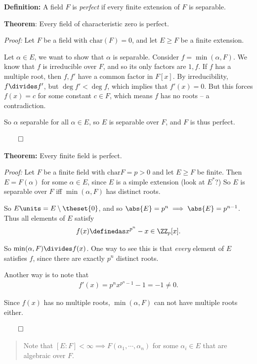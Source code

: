 \textbf{Definition:} A field \(F\) is \emph{perfect} if every finite
extension of \(F\) is separable.

\textbf{Theorem}: Every field of characteristic zero is perfect.

\emph{Proof:} Let \(F\) be a field with \(\mathrm{char}(F) = 0\), and
let \(E \geq F\) be a finite extension.

Let \(\alpha \in E\), we want to show that \(\alpha\) is separable.
Consider \(f = \min(\alpha, F)\). We know that \(f\) is irreducible over
\(F\), and so its only factors are \(1, f\). If \(f\) has a multiple
root, then \(f, f'\) have a common factor in \(F[x]\). By
irreducibility, \(f \divides f'\), but \(\deg f' < \deg f\), which
implies that \(f'(x) = 0\). But this forces \(f(x) = c\) for some
constant \(c\in F\), which means \(f\) has no roots -- a contradiction.

So \(\alpha\) separable for all \(\alpha \in E\), so \(E\) is separable
over \(F\), and \(F\) is thus perfect.

\(\qed\)

\textbf{Theorem:} Every finite field is perfect.

\emph{Proof:} Let \(F\) be a finite field with
\(\mathrm{char} F = p > 0\) and let \(E \geq F\) be finite. Then
\(E = F(\alpha)\) for some \(\alpha\in E\), since \(E\) is a simple
extension (look at \(E^*\)?) So \(E\) is separable over \(F\) iff
\(\min(\alpha, F)\) has distinct roots.

So \(E\units = E\setminus\theset{0}\), and so
\(\abs{E} = p^n \implies \abs{E} = p^{n-1}\). Thus all elements of \(E\)
satisfy
\begin{align*}
f(x) \definedas x^{p^n} - x \in \ZZ_p[x]
.\end{align*}

So \(\min(\alpha, F) \divides f(x)\). One way to see this is that
\emph{every} element of \(E\) satisfies \(f\), since there are exactly
\(p^n\) distinct roots.

Another way is to note that
\begin{align*}
f'(x) = p^nx^{p^n - 1} - 1 = -1 \neq 0
.\end{align*}

Since \(f(x)\) has no multiple roots, \(\min(\alpha, F)\) can not have
multiple roots either.

\(\qed\)

\begin{quote}
Note that \([E: F] < \infty \implies F(\alpha_1, \cdots, \alpha_n)\) for
some \(\alpha_i \in E\) that are algebraic over \(F\).
\end{quote}

